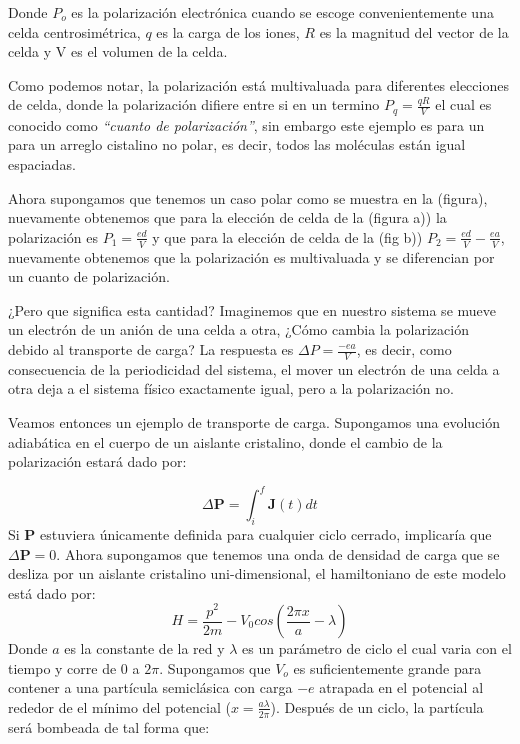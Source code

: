Donde $P_o$ es la polarización electrónica cuando se escoge convenientemente una celda centrosimétrica, $q$ es la carga de los iones, $R$ es la magnitud del vector de la celda y V es el volumen de la celda.

Como podemos notar, la polarización está multivaluada para diferentes elecciones de celda, donde la polarización difiere entre si en un termino $P_q = \frac{qR}{V}$ el cual es conocido como \textit{``cuanto de polarización''}, sin embargo este ejemplo es para un para un arreglo cistalino no polar, es decir, todos las moléculas están igual espaciadas. 

Ahora supongamos que tenemos un caso polar como se muestra en la (figura), nuevamente obtenemos que para la elección de celda de la (figura a)) la polarización es $P_1 = \frac{ed}{V}$ y que para la elección de celda de la (fig b)) $P_2 = \frac{ed}{V} - \frac{ea}{V}$, nuevamente obtenemos que la polarización es multivaluada y se diferencian por un cuanto de polarización.

¿Pero que significa esta cantidad? Imaginemos que en nuestro sistema se mueve un electrón de un anión de una celda a otra, ¿Cómo cambia la polarización debido al transporte de carga? La respuesta es $\Delta P = \frac{-ea}{V}$, es decir, como consecuencia de la periodicidad del sistema, el mover un electrón de una celda a otra deja a el sistema físico exactamente igual, pero a la polarización no.

Veamos entonces un ejemplo de transporte de carga. Supongamos una evolución adiabática en el cuerpo de un aislante cristalino, donde el cambio de la polarización estará dado por:

\begin{equation}
    \Delta \textbf{P} = \int_i^f \textbf{J}(t)dt
\end{equation}
Si \textbf{P} estuviera únicamente definida para cualquier ciclo cerrado, implicaría que  $\Delta \textbf{P} = 0$. Ahora supongamos que tenemos una onda de densidad de carga que se desliza por un aislante cristalino uni-dimensional, el hamiltoniano de este modelo está dado por:
\begin{equation}
    H =  \frac{p^2}{2m} - V_0 cos(\frac{2\pi x}{a} - \lambda)
\end{equation}
Donde $a$ es la constante de la red y $\lambda$ es un parámetro de ciclo el cual varia con el tiempo y corre de $0$ a $2\pi$. 
Supongamos que $V_o$ es suficientemente grande para contener a una partícula semiclásica con carga $-e$ atrapada en el potencial al rededor de el mínimo del potencial ($x = \frac{a\lambda}{2\pi}$). Después de un ciclo, la partícula será bombeada de tal forma que:

